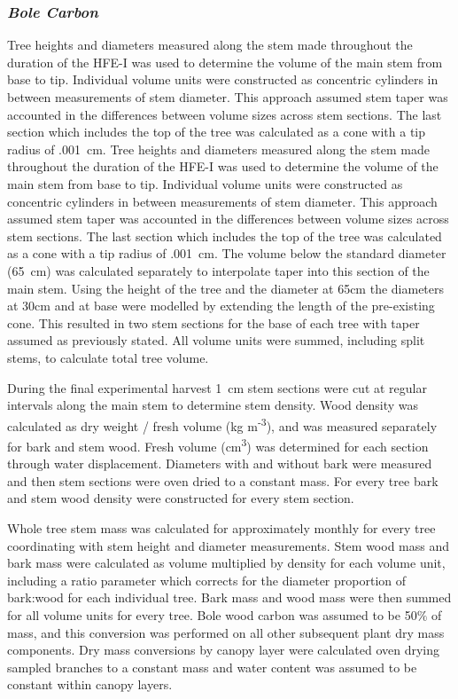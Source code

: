 \documentclass[a4paper]{article}
\begin{document}
\subsubsection*{\textit{Bole Carbon}}
Tree heights and diameters measured along the stem made throughout the duration of the HFE-I was used to determine the volume of the main stem from base to tip.  Individual volume units were constructed as concentric cylinders in between measurements of stem diameter.  This approach assumed stem taper was accounted in the differences between volume sizes across stem sections.  The last section which includes the top of the tree was calculated as a cone with a tip radius of .001~cm.  Tree heights and diameters measured along the stem made throughout the duration of the HFE-I was used to determine the volume of the main stem from base to tip.  Individual volume units were constructed as concentric cylinders in between measurements of stem diameter.  This approach assumed stem taper was accounted in the differences between volume sizes across stem sections.  The last section which includes the top of the tree was calculated as a cone with a tip radius of .001~cm.  The volume below the standard diameter (65~cm)  was calculated separately to interpolate taper into this section of the main stem.  Using the height of the tree and the diameter at 65cm the diameters at 30cm and at base were modelled by extending the length of the pre-existing cone. This resulted in two stem sections for the base of each tree with taper assumed as previously stated. All volume units were summed, including split stems, to calculate total tree volume.

During the final experimental harvest 1~cm stem sections were cut at regular intervals along the main stem to determine stem density.  Wood density was calculated as dry weight / fresh volume (kg m\textsuperscript{-3}), and was measured separately for bark and stem wood. Fresh volume (cm\textsuperscript{3}) was determined for each section through water displacement.  Diameters with and without bark were measured and then stem sections were oven dried to a constant mass.  For every tree bark and stem wood density were constructed for every stem section. 

Whole tree stem mass was calculated for approximately monthly for every tree coordinating with stem height and diameter measurements.  Stem wood mass and bark mass were calculated as volume multiplied by density for each volume unit, including a ratio parameter which corrects for the diameter proportion of bark:wood for each individual tree.  Bark mass and wood mass were then summed for all volume units for every tree.  Bole wood carbon was assumed to be 50$\%$ of mass, and this conversion was performed on all other subsequent plant dry mass components. Dry mass conversions by canopy layer were calculated oven drying sampled branches to a constant mass and water content was assumed to be constant within canopy layers.  
\end{document}
